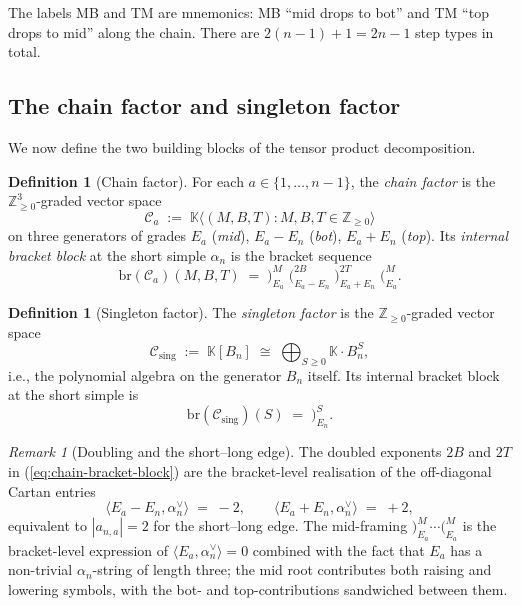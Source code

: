 \documentclass[11pt]{article}
\theoremstyle{definition}
\newtheorem{definition}[theorem]{Definition}
\theoremstyle{remark}
\newtheorem{remark}[theorem]{Remark}
\newcommand{\KK}{\mathbb{K}}
\newcommand{\Z}{\mathbb{Z}}
\newcommand{\Zn}{\Z_{\geq 0}}
\newcommand{\Cmid}{\mathcal{C}}
\newcommand{\Csing}{\mathcal{C}_{\mathrm{sing}}}
\newcommand{\br}{\mathrm{br}}
\newcommand{\labr}[1]{{)}_{#1}}
\newcommand{\labl}[1]{{(}_{#1}}
\begin{document}
The labels MB and TM are mnemonics: MB ``mid drops to bot'' and TM ``top drops to mid'' along
the chain. There are $2(n-1) + 1 = 2n - 1$ step types in total.

\subsection{The chain factor and singleton factor}\label{ssec:factors}

We now define the two building blocks of the tensor product decomposition.

\begin{definition}[Chain factor]\label{def:chain-factor}
For each $a \in \{1, \ldots, n-1\}$, the \emph{chain factor} is the $\Zn^3$-graded vector space
\[
\Cmid_a \;:=\; \KK\bigl\langle (M, B, T) : M, B, T \in \Zn \bigr\rangle
\]
on three generators of grades $E_a$ (\emph{mid}), $E_a - E_n$ (\emph{bot}), $E_a + E_n$
(\emph{top}). Its \emph{internal bracket block} at the short simple $\alpha_n$ is the bracket
sequence
\begin{equation}\label{eq:chain-bracket-block}
\br(\Cmid_a)(M, B, T) \;=\; \labr{E_a}^{M}\;\labl{E_a - E_n}^{2B}\;\labr{E_a + E_n}^{2T}\;\labl{E_a}^{M}.
\end{equation}
\end{definition}

\begin{definition}[Singleton factor]\label{def:singleton-factor}
The \emph{singleton factor} is the $\Zn$-graded vector space
\[
\Csing \;:=\; \KK[B_n] \;\cong\; \bigoplus_{S \geq 0} \KK \cdot B_n^S,
\]
i.e., the polynomial algebra on the generator $B_n$ itself. Its internal bracket block at
the short simple is
\begin{equation}\label{eq:sing-bracket-block}
\br(\Csing)(S) \;=\; \labr{E_n}^{S}.
\end{equation}
\end{definition}

\begin{remark}[Doubling and the short--long edge]\label{rmk:doubling}
The doubled exponents $2B$ and $2T$ in (\ref{eq:chain-bracket-block}) are the bracket-level
realisation of the off-diagonal Cartan entries
\[
\langle E_a - E_n, \alpha_n^\vee\rangle \;=\; -2, \qquad \langle E_a + E_n, \alpha_n^\vee\rangle \;=\; +2,
\]
equivalent to $|a_{n,a}| = 2$ for the short--long edge. The mid-framing $\labr{E_a}^M \cdots
\labl{E_a}^M$ is the bracket-level expression of $\langle E_a, \alpha_n^\vee\rangle = 0$
combined with the fact that $E_a$ has a non-trivial $\alpha_n$-string of length three; the
mid root contributes both raising and lowering symbols, with the bot- and top-contributions
sandwiched between them.
\end{remark}
\end{document}
